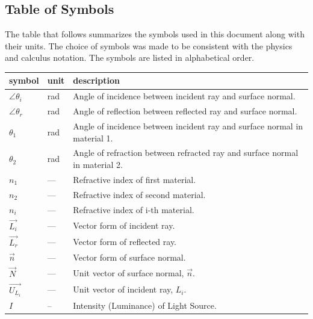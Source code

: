 \documentclass[12pt]{article}
\begin{document}

\subsection{Table of Symbols}

The table that follows summarizes the symbols used in this document along with
their units.  The choice of symbols was made to be consistent with the physics 
and calculus 
notation. The symbols are listed in alphabetical order.

\renewcommand{\arraystretch}{1.2}
\noindent \begin{longtable*}{l l p{12cm}} \toprule
\textbf{symbol} & \textbf{unit} & \textbf{description}\\
\midrule 
$\angle\theta_{i}$ & \si[per-mode=symbol] {\radian} & Angle of incidence 
between incident ray and surface normal.
\\
$\angle\theta_{r}$ & \si[per-mode=symbol] {\radian} & Angle of reflection 
between reflected ray and surface normal.
\\
$\theta_{1}$ & \si[per-mode=symbol] {\radian} & Angle of incidence 
between incident ray and surface normal in material 1.
\\
$\theta_{2}$ & \si[per-mode=symbol] {\radian} & Angle of refraction 
between refracted ray and surface normal in material 2.
\\
$n_{1}$ & --- & Refractive index of first material.
\\
$n_{2}$ & --- & Refractive index of second material.
\\
$n_{i}$ & --- & Refractive index of i-th material.
\\
$\vec{L_{i}}$ & --- & Vector form of incident ray.
\\
$\vec{L_{r}}$ & --- & Vector form of reflected ray.
\\
$\vec{n}$ & --- & Vector form of surface normal.
\\
$\vec{N}$ & --- & Unit vector of surface normal, $\vec{n}$.
\\
$\vec{U_{L_{i}}}$ & --- & Unit vector of incident ray, $L_{i}$. 
\\
$I$ & -- & Intensity (Luminance) of Light Source. \\

\bottomrule
\end{longtable*}
\end{document}
